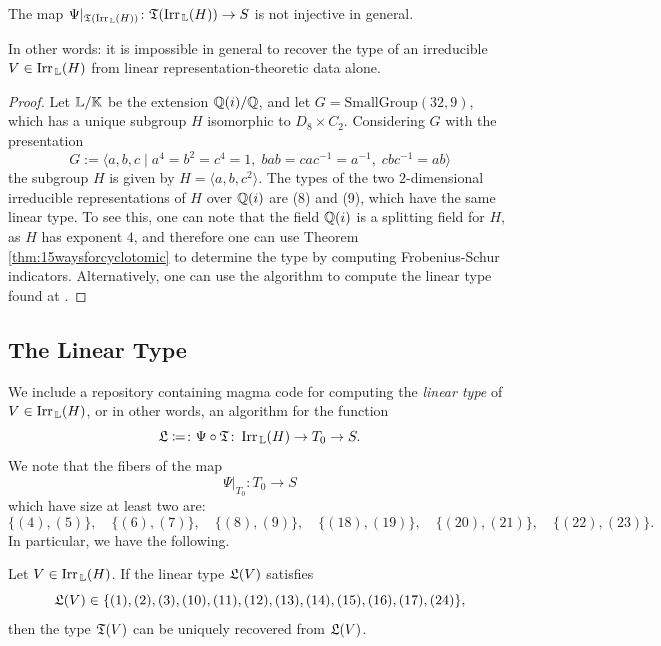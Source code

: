 \begin{cor}
The map $\Psi|_{{\mathfrak T}(\operatorname{Irr}_{\, {\mathbb L}}(H))} \colon {\mathfrak T}(\operatorname{Irr}_{\, {\mathbb L}}(H)) \rightarrow S$ is not injective in general.
\end{cor}

In other words: it is impossible in general to recover the type of an irreducible $V \in \operatorname{Irr}_{\, {\mathbb L}}(H)$ from linear representation-theoretic data alone.

\begin{proof}
    Let ${\mathbb L} / {\mathbb K}$ be the extension ${\mathbb Q}(i) / {\mathbb Q}$, and let $G = \text{SmallGroup}(32,9)$, which has a unique subgroup $H$ isomorphic to $D_8 \times C_2$. Considering $G$ with the presentation
    \[
G := \langle a,b,c \mid 
a^4 = b^2 = c^4 = 1,\;
bab = c a c^{-1} = a^{-1},\;
c b c^{-1} = ab
\rangle
\]
the subgroup $H$ is given by $H = \langle a, b, c^2 \rangle$. The types of the two $2$-dimensional irreducible representations of $H$ over ${\mathbb Q}(i)$ are (8) and (9), which have the same linear type. To see this, one can note that the field ${\mathbb Q}(i)$ is a splitting field for $H$, as $H$ has exponent $4$, and therefore one can use Theorem \ref{thm:15waysforcyclotomic} to determine the type by computing Frobenius-Schur indicators. Alternatively, one can use the algorithm to compute the linear type found at \cite{GITHUB}.
\end{proof}

\subsection{The Linear Type}\label{sect:lineartype}

We include a repository \cite{GITHUB} containing magma code for computing the \emph{linear type} of $V \in \operatorname{Irr}_{\, {\mathbb L}}(H)$, or in other words, an algorithm for the function
\[
   {\mathfrak L} \coloneqq \colon \Psi \circ {\mathfrak T} \colon \operatorname{Irr}_{\, {\mathbb L}}(H) \rightarrow T_0 \rightarrow S.
\]
We note that the fibers of the map
\[
    \Psi|_{T_0} \colon T_0 \rightarrow S
\]
which have size at least two are:
\[
    \{(4), (5)\}, \quad \{(6), (7)\}, \quad \{(8), (9)\}, \quad \{(18), (19)\}, \quad \{(20), (21)\}, \quad \{(22), (23)\}.
\]
In particular, we have the following. 
\begin{cor}\label{cor:canrecoverSLtype}
Let $V \in \operatorname{Irr}_{\, {\mathbb L}}(H)$. If the linear type ${\mathfrak L}(V)$ satisfies
\[
{\mathfrak L}(V) \in \{(1), (2), (3), (10), (11), (12), (13), (14), (15), (16), (17), (24)\},
\]
then the type ${\mathfrak T}(V)$ can be uniquely recovered from ${\mathfrak L}(V)$.
\end{cor}

